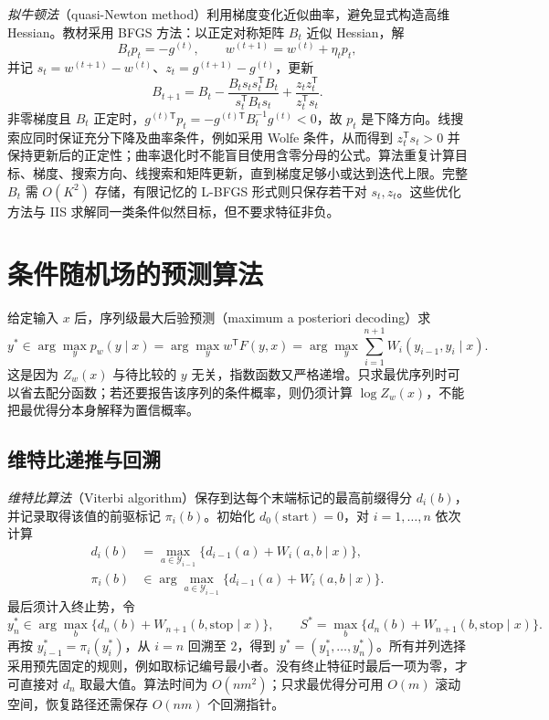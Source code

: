 \emph{拟牛顿法}（quasi-Newton method）利用梯度变化近似曲率，避免显式构造高维 Hessian。教材采用 BFGS 方法：以正定对称矩阵 $B_t$ 近似 Hessian，解
\[
  B_t p_t=-g^{(t)},\qquad
  w^{(t+1)}=w^{(t)}+\eta_t p_t,
\]
并记 $s_t=w^{(t+1)}-w^{(t)}$、$z_t=g^{(t+1)}-g^{(t)}$，更新
\begin{equation}
\label{eq:lihang-crf-bfgs}
  B_{t+1}=B_t-
      \frac{B_ts_ts_t^{\mathsf T}B_t}{s_t^{\mathsf T}B_ts_t}
      +\frac{z_tz_t^{\mathsf T}}{z_t^{\mathsf T}s_t}.
\end{equation}
非零梯度且 $B_t$ 正定时，$g^{(t)\mathsf T}p_t=-g^{(t)\mathsf T}B_t^{-1}g^{(t)}<0$，故 $p_t$ 是下降方向。线搜索应同时保证充分下降及曲率条件，例如采用 Wolfe 条件，从而得到 $z_t^{\mathsf T}s_t>0$ 并保持更新后的正定性；曲率退化时不能盲目使用含零分母的公式。算法重复计算目标、梯度、搜索方向、线搜索和矩阵更新，直到梯度足够小或达到迭代上限。完整 $B_t$ 需 $O(K^2)$ 存储，有限记忆的 L-BFGS 形式则只保存若干对 $s_t,z_t$。这些优化方法与 IIS 求解同一类条件似然目标，但不要求特征非负。

\section{条件随机场的预测算法}
\label{sec:lihang-crf-decoding}

给定输入 $x$ 后，序列级最大后验预测（maximum a posteriori decoding）求
\begin{equation}
\label{eq:lihang-crf-map}
  y^*\in\arg\max_y p_w(y\mid x)
      =\arg\max_y w^{\mathsf T}F(y,x)
      =\arg\max_y\sum_{i=1}^{n+1}W_i(y_{i-1},y_i\mid x).
\end{equation}
这是因为 $Z_w(x)$ 与待比较的 $y$ 无关，指数函数又严格递增。只求最优序列时可以省去配分函数；若还要报告该序列的条件概率，则仍须计算 $\log Z_w(x)$，不能把最优得分本身解释为置信概率。

\subsection{维特比递推与回溯}
\label{subsec:lihang-crf-viterbi}

\emph{维特比算法}（Viterbi algorithm）保存到达每个末端标记的最高前缀得分 $d_i(b)$，并记录取得该值的前驱标记 $\pi_i(b)$。初始化 $d_0(\mathrm{start})=0$，对 $i=1,\ldots,n$ 依次计算
\begin{align}
\label{eq:lihang-crf-viterbi-score}
  d_i(b)&=\max_{a\in\mathcal Y_{i-1}}
       \{d_{i-1}(a)+W_i(a,b\mid x)\},\\
\label{eq:lihang-crf-viterbi-backpointer}
  \pi_i(b)&\in\arg\max_{a\in\mathcal Y_{i-1}}
       \{d_{i-1}(a)+W_i(a,b\mid x)\}.
\end{align}
最后须计入终止势，令
\[
  y_n^*\in\arg\max_b\{d_n(b)+W_{n+1}(b,\mathrm{stop}\mid x)\},\qquad
  S^*=\max_b\{d_n(b)+W_{n+1}(b,\mathrm{stop}\mid x)\}.
\]
再按 $y_{i-1}^*=\pi_i(y_i^*)$，从 $i=n$ 回溯至 $2$，得到 $y^*=(y_1^*,\ldots,y_n^*)$。所有并列选择采用预先固定的规则，例如取标记编号最小者。没有终止特征时最后一项为零，才可直接对 $d_n$ 取最大值。算法时间为 $O(nm^2)$；只求最优得分可用 $O(m)$ 滚动空间，恢复路径还需保存 $O(nm)$ 个回溯指针。

